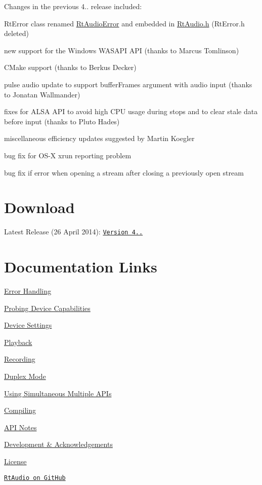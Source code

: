 Changes in the previous 4.. release included\+:


\begin{DoxyItemize}
\item Rt\+Error class renamed \hyperlink{class_rt_audio_error}{Rt\+Audio\+Error} and embedded in \hyperlink{_rt_audio_8h}{Rt\+Audio.\+h} (Rt\+Error.\+h deleted)
\item new support for the Windows W\+A\+S\+A\+PI A\+PI (thanks to Marcus Tomlinson)
\item C\+Make support (thanks to Berkus Decker)
\item pulse audio update to support buffer\+Frames argument with audio input (thanks to Jonatan Wallmander)
\item fixes for A\+L\+SA A\+PI to avoid high C\+PU usage during stops and to clear stale data before input (thanks to Pluto Hades)
\item miscellaneous efficiency updates suggested by Martin Koegler
\item bug fix for O\+S-\/X xrun reporting problem
\item bug fix if error when opening a stream after closing a previously open stream
\end{DoxyItemize}\hypertarget{index_download}{}\section{Download}\label{index_download}
Latest Release (26 April 2014)\+: \href{http://www.music.mcgill.ca/~gary/rtaudio/release/rtaudio-4.1.1.tar.gz}{\tt Version 4..}\hypertarget{index_documentation}{}\section{Documentation Links}\label{index_documentation}

\begin{DoxyEnumerate}
\item \hyperlink{errors}{Error Handling}
\item \hyperlink{probe}{Probing Device Capabilities}
\item \hyperlink{settings}{Device Settings}
\item \hyperlink{playback}{Playback}
\item \hyperlink{recording}{Recording}
\item \hyperlink{duplex}{Duplex Mode}
\item \hyperlink{tutorial.txt_multi}{Using Simultaneous Multiple A\+P\+Is}
\item \hyperlink{tutorial.txt_compiling}{Compiling}
\item \hyperlink{tutorial.txt_apinotes}{A\+PI Notes}
\item \hyperlink{tutorial.txt_acknowledge}{Development \& Acknowledgements}
\item \hyperlink{tutorial.txt_license}{License}
\item \href{http://github.com/thestk/rtaudio}{\tt Rt\+Audio on Git\+Hub} 
\end{DoxyEnumerate}
